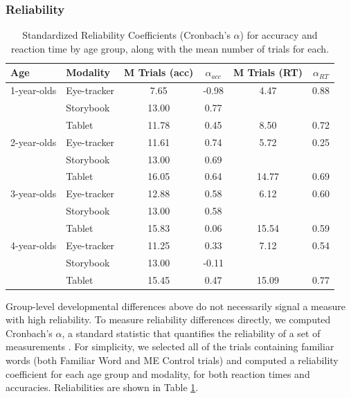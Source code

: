\documentclass[man,noapacite]{apa2}
\begin{document}
\subsubsection{Reliability}

\begin{table}[t]
\centering
\caption{\label{tab:reliability} Standardized Reliability Coefficients (Cronbach's $\alpha$)  for accuracy and reaction time by age group, along with the mean number of trials for each.}
\begin{tabular}{llcccc}
  \hline
Age & Modality & M Trials (acc) & $\alpha_{acc}$ & M Trials (RT) & $\alpha_{RT}$ \\ 
  \hline
1-year-olds & Eye-tracker & 7.65 & -0.98 & 4.47 & 0.88\\ 
    & Storybook & 13.00 & 0.77 & & \\ 
    & Tablet & 11.78 & 0.45 & 8.50 & 0.72\\ 
2-year-olds & Eye-tracker & 11.61 & 0.74 & 5.72 & 0.25 \\ 
    & Storybook & 13.00 & 0.69 & & \\ 
    & Tablet & 16.05 & 0.64 & 14.77 & 0.69\\ 
3-year-olds & Eye-tracker & 12.88 & 0.58 & 6.12 & 0.60\\ 
    & Storybook & 13.00 & 0.58 & & \\ 
    & Tablet & 15.83 & 0.06 & 15.54 & 0.59 \\ 
4-year-olds & Eye-tracker & 11.25 & 0.33  & 7.12 & 0.54 \\ 
    & Storybook & 13.00 & -0.11& &  \\ 
    & Tablet & 15.45 & 0.47 & 15.09 & 0.77 \\ 
   \hline
\end{tabular}
\end{table}

Group-level developmental differences above do not necessarily signal a measure with high reliability. To measure reliability differences directly, we computed Cronbach's $\alpha$, a standard statistic that quantifies the reliability of a set of measurements \cite{santos1999}. For simplicity, we selected all of the trials containing familiar words (both Familiar Word and ME Control trials) and computed a reliability coefficient for each age group and modality, for both reaction times and accuracies. Reliabilities are shown in Table \ref{tab:reliability}. 
\end{document}
